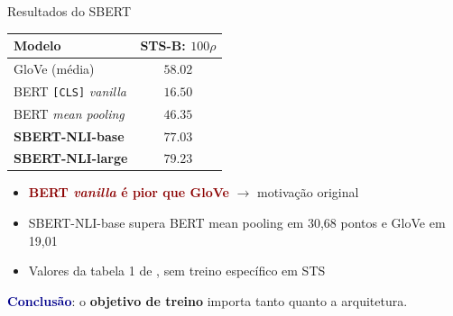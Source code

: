 \documentclass[aspectratio=169, xcolor=dvipsnames]{beamer}
\begin{document}
  \begin{frame}{Resultados do SBERT}
    \centering
    \begin{tabular}{lc}
      \toprule
      \textbf{Modelo} & \textbf{STS-B: $100\rho$} \\
      \midrule
      GloVe (média) & $58.02$ \\
      BERT \texttt{[CLS]} \textit{vanilla} & $16.50$ \\
      BERT \textit{mean pooling} & $46.35$ \\
      \midrule
      \textbf{SBERT-NLI-base} & \textbf{$\mathbf{77.03}$} \\
      \textbf{SBERT-NLI-large} & \textbf{$\mathbf{79.23}$} \\
      \bottomrule
    \end{tabular}
    \vspace{0.5em}
    \begin{itemize}
      \item \textcolor{DarkRed}{\textbf{BERT \textit{vanilla} é pior que GloVe}} $\to$ motivação original
      \item SBERT-NLI-base supera BERT mean pooling em 30,68 pontos e GloVe em 19,01
      \item Valores da tabela 1 de \cite{reimers2019sbert}, sem treino específico em STS
    \end{itemize}
    \vspace{0.3em}
    \textcolor{DarkBlue}{\textbf{Conclusão}}: o \textbf{objetivo de treino} importa tanto quanto a arquitetura.
  \end{frame}
\end{document}
